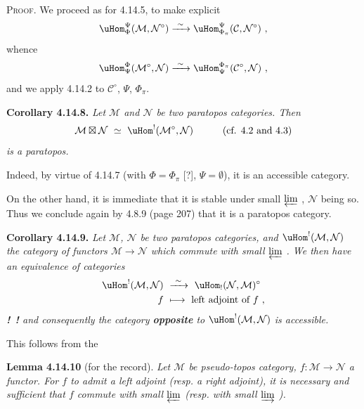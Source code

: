 \noindent\textsc{Proof}. We proceed as for 4.14.5, to make explicit
\[
\uHom^{\Psi}_{\Phi}(\mathcal{M},\mathcal{N}^{\circ}) \xrightarrow{\ \sim\ } \uHom^{\Psi}_{\Phi_\pi}(\mathcal{C},\mathcal{N}^{\circ})\ ,
\]
whence
\[
\uHom^{\Phi}_{\Psi}(\mathcal{M}^{\circ},\mathcal{N}) \xrightarrow{\ \sim\ } \uHom^{\Phi_\pi}_{\Psi}(\mathcal{C}^{\circ},\mathcal{N})\ ,
\]
and we apply 4.14.2 to $\mathcal{C}^{\circ}$, $\Psi$, $\Phi_\pi$.

\noindent\textbf{Corollary 4.14.8.} {\itshape Let $\mathcal{M}$ and $\mathcal{N}$ be two paratopos categories. Then
\[
\mathcal{M}\boxtimes\mathcal{N}\ \simeq\ \uHom^{!}(\mathcal{M}^{\circ},\mathcal{N}) \qquad\quad \text{(cf. 4.2 and 4.3)}
\]
is a paratopos.}

Indeed, by virtue of 4.14.7 (with $\Phi=\Phi_\pi$ [?], $\Psi=\emptyset$), it is an accessible category.


On the other hand, it is immediate that it is stable under small $\varprojlim$ , $\mathcal{N}$ being so. Thus we conclude again by 4.8.9 (page 207) that it is a paratopos category.

\noindent\textbf{Corollary 4.14.9.} {\itshape Let $\mathcal{M}$, $\mathcal{N}$ be two paratopos categories, and $\uHom^{!}(\mathcal{M},\mathcal{N})$ the category of functors $\mathcal{M}\longrightarrow\mathcal{N}$ which commute with small $\varprojlim$ . We then have an equivalence of categories
\[
\begin{aligned}
\uHom^{!}(\mathcal{M},\mathcal{N}) &\ \xrightarrow{\ \sim\ }\ \uHom_{!}(\mathcal{N},\mathcal{M})^{\circ}\\
f &\ \longmapsto\ \text{left adjoint of } f\ ,
\end{aligned}
\]
\noindent\textup{\textbf{!}}\ \textup{\textbf{!}} and consequently the category \textup{\textbf{opposite}} to $\uHom^{!}(\mathcal{M},\mathcal{N})$ is accessible.} %

This follows from the

\noindent\textbf{Lemma 4.14.10} (for the record). {\itshape Let $\mathcal{M}$ be pseudo-topos category, $f:\mathcal{M}\longrightarrow\mathcal{N}$ a functor. For $f$ to admit a left adjoint (resp. a right adjoint), it is necessary and sufficient that $f$ commute with small $\varprojlim$ (resp. with small $\varinjlim$ ).}